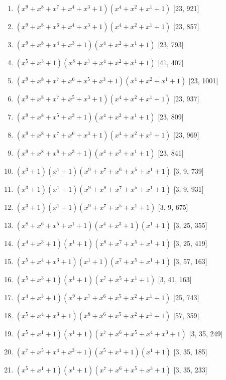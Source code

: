 \documentclass[10pt,twocolumn]{article}
\begin{document}
\begin{enumerate}
\item $(x^{9} + x^{8} + x^{7} + x^{4} + x^{3} + 1)(x^{4} + x^{2} + x^{1} + 1)$  [23, 921]
\item $(x^{9} + x^{8} + x^{6} + x^{4} + x^{3} + 1)(x^{4} + x^{2} + x^{1} + 1)$  [23, 857]
\item $(x^{9} + x^{8} + x^{4} + x^{3} + 1)(x^{4} + x^{2} + x^{1} + 1)$  [23, 793]
\item $(x^{5} + x^{3} + 1)(x^{8} + x^{7} + x^{4} + x^{2} + x^{1} + 1)$  [41, 407]
\item $(x^{9} + x^{8} + x^{7} + x^{6} + x^{5} + x^{3} + 1)(x^{4} + x^{2} + x^{1} + 1)$  [23, 1001]
\item $(x^{9} + x^{8} + x^{7} + x^{5} + x^{3} + 1)(x^{4} + x^{2} + x^{1} + 1)$  [23, 937]
\item $(x^{9} + x^{8} + x^{5} + x^{3} + 1)(x^{4} + x^{2} + x^{1} + 1)$  [23, 809]
\item $(x^{9} + x^{8} + x^{7} + x^{6} + x^{3} + 1)(x^{4} + x^{2} + x^{1} + 1)$  [23, 969]
\item $(x^{9} + x^{8} + x^{6} + x^{3} + 1)(x^{4} + x^{2} + x^{1} + 1)$  [23, 841]
\item $(x^{3} + 1)(x^{1} + 1)(x^{9} + x^{7} + x^{6} + x^{5} + x^{1} + 1)$  [3, 9, 739]
\item $(x^{3} + 1)(x^{1} + 1)(x^{9} + x^{8} + x^{7} + x^{5} + x^{1} + 1)$  [3, 9, 931]
\item $(x^{3} + 1)(x^{1} + 1)(x^{9} + x^{7} + x^{5} + x^{1} + 1)$  [3, 9, 675]
\item $(x^{8} + x^{6} + x^{5} + x^{1} + 1)(x^{4} + x^{3} + 1)(x^{1} + 1)$  [3, 25, 355]
\item $(x^{4} + x^{3} + 1)(x^{1} + 1)(x^{8} + x^{7} + x^{5} + x^{1} + 1)$  [3, 25, 419]
\item $(x^{5} + x^{4} + x^{3} + 1)(x^{1} + 1)(x^{7} + x^{5} + x^{1} + 1)$  [3, 57, 163]
\item $(x^{5} + x^{3} + 1)(x^{1} + 1)(x^{7} + x^{5} + x^{1} + 1)$  [3, 41, 163]
\item $(x^{4} + x^{3} + 1)(x^{9} + x^{7} + x^{6} + x^{5} + x^{2} + x^{1} + 1)$  [25, 743]
\item $(x^{5} + x^{4} + x^{3} + 1)(x^{8} + x^{6} + x^{5} + x^{2} + x^{1} + 1)$  [57, 359]
\item $(x^{5} + x^{1} + 1)(x^{1} + 1)(x^{7} + x^{6} + x^{5} + x^{4} + x^{3} + 1)$  [3, 35, 249]
\item $(x^{7} + x^{5} + x^{4} + x^{3} + 1)(x^{5} + x^{1} + 1)(x^{1} + 1)$  [3, 35, 185]
\item $(x^{5} + x^{1} + 1)(x^{1} + 1)(x^{7} + x^{6} + x^{5} + x^{3} + 1)$  [3, 35, 233]

\end{enumerate}
\end{document}
